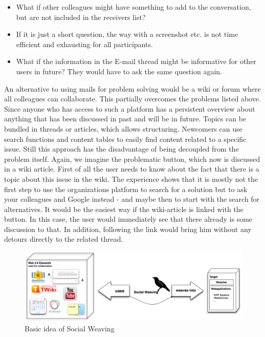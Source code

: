 \begin{itemize}
\item What if other colleagues might have something to add to the conversation, but are not included in the receivers list? 

\item If it is just a short question, the way with a screenshot etc. is not time efficient and exhausting for all participants. 

\item What if the information in the E-mail thread might be informative for other users in future? They would have to ask the same question again. 

\end{itemize}

An alternative to using mails for problem solving would be a wiki or forum where all colleagues can collaborate. This partially overcomes the problems listed above. Since anyone who has access to such a platform has a persistent overview about anything that has been discussed in past and will be in future. Topics can be bundled in threads or articles, which allows structuring. Newcomers can use search functions and content tables to easily find content related to a specific issue. 
Still this approach has the disadvantage of being decoupled from the problem itself. Again, we imagine the problematic button, which now is discussed in a wiki article. First of all the user needs to know about the fact that there is a topic about this issue in the wiki. The experience shows that it is mostly not the first step to use the organizations platform to search for a solution but to ask your colleagues and Google instead - and maybe then to start with the search for alternatives.  It would be the easiest way if the wiki-article is linked with the button. In this case, the user would immediately see that there already is some discussion to that. In addition, following the link would bring him without any detours directly to the related thread.  

\begin{figure}\centering
		\includegraphics[width=13cm]{images/idea-social-weaving.png}
		\caption{Basic idea of Social Weaving}
		\label{idead-social-weaving}
\end{figure} 


